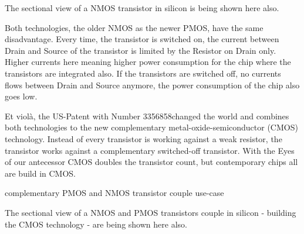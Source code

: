 The sectional view of a NMOS transistor in silicon is being shown here also.

Both technologies, the older NMOS as the newer PMOS, have the same disadvantage. Every time, the transistor is switched on, the current between Drain and Source of the transistor is limited by the Resistor on Drain only. Higher currents here meaning higher power consumption for the chip where the transistors are integrated also. If the transistors are switched off, no currents flows between Drain and Source anymore, the power consumption of the chip also goes low.

Et violà, the US-Patent with Number 3356858\footnotemark changed the world and combines both technologies to the new complementary metal-oxide-semiconductor (CMOS) technology. Instead of every transistor is working against a weak resistor, the transistor works against a complementary switched-off transistor. With the Eyes of our antecessor CMOS doubles the transistor count, but contemporary chips all are build in CMOS.

\begin{center}
    complementary PMOS and NMOS transistor couple use-case
    \begin{figure}[h] %
        \centering
        \begin{circuitdiagram}{20}{20}
        \end{circuitdiagram}
    \end{figure}
\end{center}

The sectional view of a NMOS and PMOS transistors couple in silicon - building the CMOS technology - are being shown here also.
